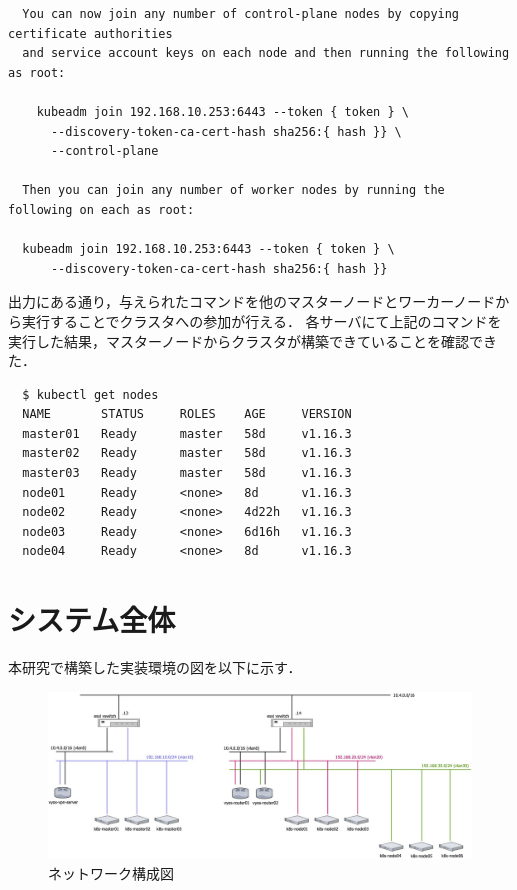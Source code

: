 \begin{lstlisting}
  You can now join any number of control-plane nodes by copying certificate authorities
  and service account keys on each node and then running the following as root:

    kubeadm join 192.168.10.253:6443 --token { token } \
      --discovery-token-ca-cert-hash sha256:{ hash }} \
      --control-plane

  Then you can join any number of worker nodes by running the following on each as root:

  kubeadm join 192.168.10.253:6443 --token { token } \
      --discovery-token-ca-cert-hash sha256:{ hash }}
\end{lstlisting}

出力にある通り，与えられたコマンドを他のマスターノードとワーカーノードから実行することでクラスタへの参加が行える．
各サーバにて上記のコマンドを実行した結果，マスターノードからクラスタが構築できていることを確認できた．

\begin{lstlisting}
  $ kubectl get nodes
  NAME       STATUS     ROLES    AGE     VERSION
  master01   Ready      master   58d     v1.16.3
  master02   Ready      master   58d     v1.16.3
  master03   Ready      master   58d     v1.16.3
  node01     Ready      <none>   8d      v1.16.3
  node02     Ready      <none>   4d22h   v1.16.3
  node03     Ready      <none>   6d16h   v1.16.3
  node04     Ready      <none>   8d      v1.16.3
\end{lstlisting}

\section{システム全体}
\label{implementation:system}
本研究で構築した実装環境の図を以下に示す．

\begin{landscape}
  \begin{figure}[htbp]
    \begin{center}
      \includegraphics[width=\textwidth]{./figures/network-diagram.jpg}
      \caption{ネットワーク構成図}
    \end{center}
  \end{figure}
\end{landscape}

